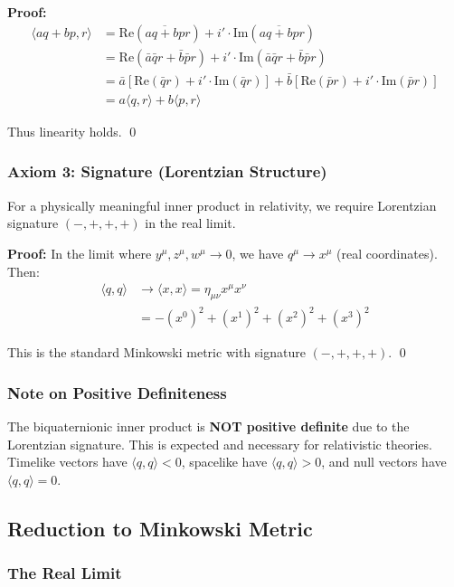 \textbf{Proof:}
\begin{align}
\langle aq + bp, r \rangle &= \text{Re}(\overline{aq + bp} r) + i' \cdot \text{Im}(\overline{aq + bp} r) \\
&= \text{Re}(\bar{a}\bar{q} r + \bar{b}\bar{p} r) + i' \cdot \text{Im}(\bar{a}\bar{q} r + \bar{b}\bar{p} r) \\
&= \bar{a} \left[\text{Re}(\bar{q} r) + i' \cdot \text{Im}(\bar{q} r)\right] + \bar{b} \left[\text{Re}(\bar{p} r) + i' \cdot \text{Im}(\bar{p} r)\right] \\
&= a \langle q, r \rangle + b \langle p, r \rangle
\end{align}

Thus linearity holds. \qed

\subsubsection{Axiom 3: Signature (Lorentzian Structure)}

For a physically meaningful inner product in relativity, we require Lorentzian signature $(-,+,+,+)$ in the real limit.

\textbf{Proof:} In the limit where $y^{\mu}, z^{\mu}, w^{\mu} \to 0$, we have $q^{\mu} \to x^{\mu}$ (real coordinates). Then:
\begin{align}
\langle q, q \rangle &\to \langle x, x \rangle = \eta_{\mu\nu} x^{\mu} x^{\nu} \\
&= -(x^0)^2 + (x^1)^2 + (x^2)^2 + (x^3)^2
\end{align}

This is the standard Minkowski metric with signature $(-,+,+,+)$. \qed

\subsubsection{Note on Positive Definiteness}

The biquaternionic inner product is \textbf{NOT positive definite} due to the Lorentzian signature. This is expected and necessary for relativistic theories. Timelike vectors have $\langle q, q \rangle < 0$, spacelike have $\langle q, q \rangle > 0$, and null vectors have $\langle q, q \rangle = 0$.

\subsection{Reduction to Minkowski Metric}

\subsubsection{The Real Limit}

